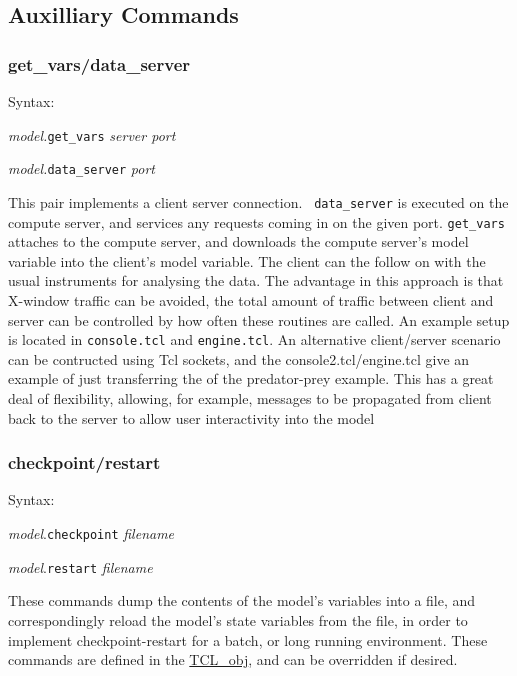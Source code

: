 \subsection{Auxilliary Commands}

\subsubsection{get\_vars/data\_server}\label{get_vars/data_server}

Syntax:

{\em model.}{\tt get\_vars} {\em server port}

{\em model.}{\tt data\_server} {\em port}

This pair implements a client server connection. {\tt
  data\_server}  is
executed on the compute server, and services any requests coming in on
the given port. {\tt get\_vars} attaches to the compute
server, and downloads the compute server's model variable into
the client's model variable. The client can the follow on with the
usual instruments for analysing the data. The advantage in this
approach is that  X-window traffic can be avoided, the total amount of
traffic between client and server can be controlled by how often these
routines are called. An example setup is located in {\tt console.tcl}
and {\tt engine.tcl}. An alternative client/server scenario can be
contructed using Tcl sockets, and the console2.tcl/engine.tcl give an
example of just transferring the \bn{} of the predator-prey
example. This has a great deal of flexibility, allowing, for example,
messages to be propagated from client back to the server to allow user
interactivity into the model

\subsubsection{checkpoint/restart}\label{checkpoint/restart}

Syntax:

{\em model}.{\tt checkpoint} {\em filename}

{\em model}.{\tt restart} {\em filename}

These commands dump the contents of the model's variables into a file,
and correspondingly reload the model's state variables from the file,
in order to implement checkpoint-restart for a batch, or long running
environment. These commands are defined in the \hyperref{{\tt
  TCL\_obj\_t} class}{(\S}{)}{TCL_obj}, and can be
overridden if desired.

